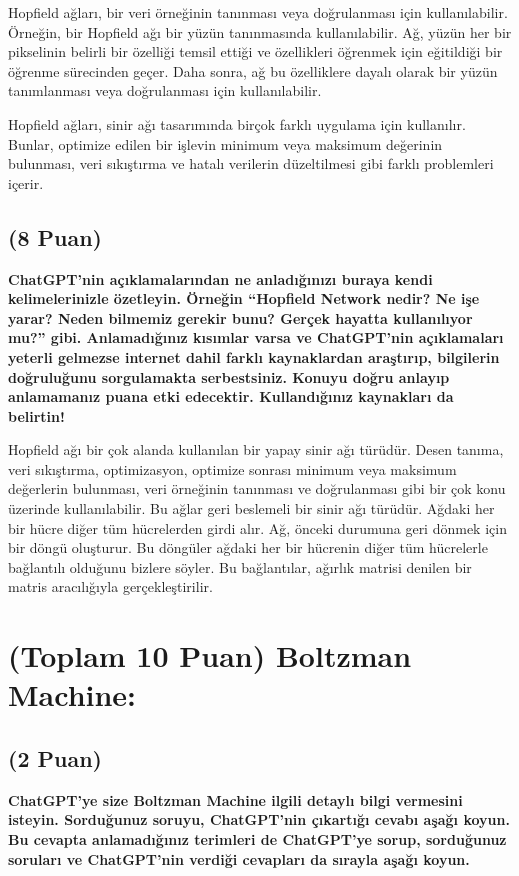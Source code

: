 \documentclass[11pt]{article}
\begin{document}
Hopfield ağları, bir veri örneğinin tanınması veya doğrulanması için kullanılabilir. Örneğin, bir Hopfield ağı bir yüzün tanınmasında kullanılabilir. Ağ, yüzün her bir pikselinin belirli bir özelliği temsil ettiği ve özellikleri öğrenmek için eğitildiği bir öğrenme sürecinden geçer. Daha sonra, ağ bu özelliklere dayalı olarak bir yüzün tanımlanması veya doğrulanması için kullanılabilir.

Hopfield ağları, sinir ağı tasarımında birçok farklı uygulama için kullanılır. Bunlar, optimize edilen bir işlevin minimum veya maksimum değerinin bulunması, veri sıkıştırma ve hatalı verilerin düzeltilmesi gibi farklı problemleri içerir.


\subsection{(8 Puan)} \textbf{ChatGPT’nin açıklamalarından ne anladığınızı buraya kendi kelimelerinizle özetleyin. Örneğin ``Hopfield Network nedir? Ne işe yarar? Neden bilmemiz gerekir bunu? Gerçek hayatta kullanılıyor mu?'' gibi. Anlamadığınız kısımlar varsa ve ChatGPT’nin açıklamaları yeterli gelmezse internet dahil farklı kaynaklardan araştırıp, bilgilerin doğruluğunu sorgulamakta serbestsiniz. Konuyu doğru anlayıp anlamamanız puana etki edecektir. Kullandığınız kaynakları da belirtin!}

Hopfield ağı bir çok alanda kullanılan bir yapay sinir ağı türüdür. Desen tanıma, veri sıkıştırma, optimizasyon, optimize sonrası minimum veya maksimum değerlerin bulunması, veri örneğinin tanınması ve doğrulanması gibi bir çok konu üzerinde kullanılabilir.
Bu ağlar geri beslemeli bir sinir ağı türüdür. Ağdaki her bir hücre diğer tüm hücrelerden girdi alır. Ağ, önceki durumuna geri dönmek için bir döngü oluşturur. Bu döngüler ağdaki her bir hücrenin diğer tüm hücrelerle bağlantılı olduğunu bizlere söyler. Bu bağlantılar, ağırlık matrisi denilen bir matris aracılığıyla gerçekleştirilir.


\section{(Toplam 10 Puan) Boltzman Machine:}

\subsection{(2 Puan)} \textbf{ChatGPT’ye size Boltzman Machine ilgili detaylı bilgi vermesini isteyin. Sorduğunuz soruyu, ChatGPT'nin çıkartığı cevabı aşağı koyun. Bu cevapta anlamadığınız terimleri de ChatGPT’ye sorup, sorduğunuz soruları ve ChatGPT’nin verdiği cevapları da sırayla aşağı koyun.}
\end{document}

